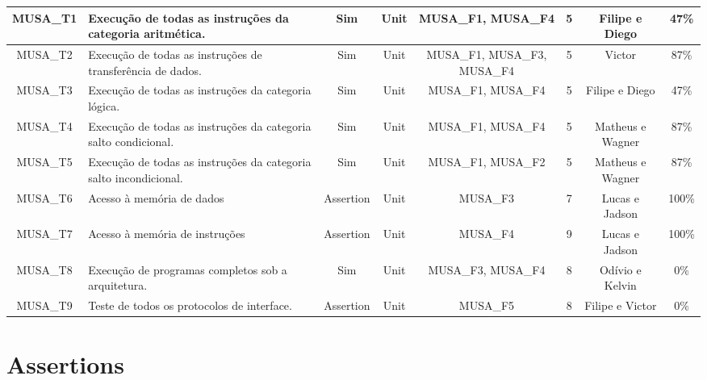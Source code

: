 \documentclass{article}
\begin{document}
\begin{landscape}
\begin{center}
\begin{longtable}[pos]{| c | m{5cm} | c | c | c | c | c | c |}
        \hline
        \endlastfoot
      	MUSA\_T1      & Execução de todas as instruções da categoria aritmética.          &	Sim       & Unit & MUSA\_F1, MUSA\_F4 & 5 & Filipe e Diego & 47\% \\ \hline   
      	MUSA\_T2      & Execução de todas as instruções de transferência de dados.        &	Sim       & Unit & MUSA\_F1, MUSA\_F3, MUSA\_F4 & 5 & Victor & 87\% \\ \hline   
      	MUSA\_T3      & Execução de todas as instruções da categoria lógica.              &	Sim       & Unit & MUSA\_F1, MUSA\_F4 & 5 & Filipe e Diego & 47\% \\ \hline  
      	MUSA\_T4      & Execução de todas as instruções da categoria salto condicional.   &	Sim       & Unit & MUSA\_F1, MUSA\_F4 & 5 & Matheus e Wagner & 87\% \\ \hline 
      	MUSA\_T5      & Execução de todas as instruções da categoria salto incondicional. &	Sim       & Unit & MUSA\_F1, MUSA\_F2 & 5 & Matheus e Wagner & 87\% \\ \hline 
	      MUSA\_T6      & Acesso à memória de dados                                       &	Assertion & Unit & MUSA\_F3           & 7 & Lucas e Jadson & 100\% \\ \hline        
	      MUSA\_T7      & Acesso à memória de instruções                                  &	Assertion & Unit & MUSA\_F4           & 9 & Lucas e Jadson & 100\% \\ \hline        
	      MUSA\_T8      & Execução de programas completos sob a arquitetura.              &	Sim       & Unit & MUSA\_F3, MUSA\_F4 & 8 & Odívio e Kelvin & 0\% \\ \hline        
	      MUSA\_T9      & Teste de todos os protocolos de interface.                      & Assertion & Unit & MUSA\_F5           & 8 & Filipe e Victor & 0\% \\ \hline        

      \end{longtable}
    \end{center}		
  \end{landscape}
  
  \newpage
	\section{Assertions}
\end{document}
